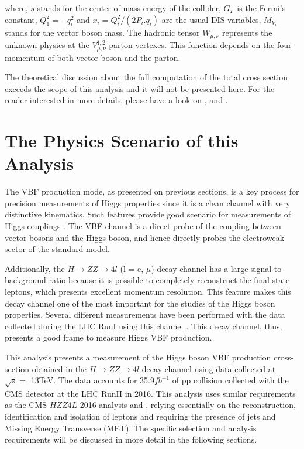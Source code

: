 where, $s$ stands for the center-of-mass energy of the collider, $G_{F}$ is the Fermi's constant, $Q_{1}^{2} = -q_{i}^{2}$ and $x_{i} = Q_{i}^{2}/(2P_{i}.q_{i})$ are the usual DIS variables, $M_{V_{i}}$ stands for the vector boson mass. The hadronic tensor $W_{\mu,\nu}$ represents the unknown physics at the $V_{\mu,\nu}^{1,2}$-parton vertexes. This function depends on the four-momentum of both vector boson and the parton. 

The theoretical discussion about the full computation of the total cross section exceeds the scope of this analysis and it will not be presented here. For the reader interested in more details, please have a look on \cite{bib:PhysRep457-1-2005}, \cite{bib:PhysRevLett69-3274-1992} and \cite{bib:PhysRevLett105-011801-2010}.


\section{The Physics Scenario of this Analysis}
The VBF production mode, as presented on previous sections, is a key process for precision measurements of Higgs properties since it is a clean channel with very distinctive kinematics. Such features provide good scenario for measurements of Higgs couplings \cite{bib:PhysRevD62_013009_2000}. The VBF channel is a direct probe of the coupling between vector bosons and the Higgs boson, and hence directly probes the electroweak sector of the standard model.

Additionally, the $H \rightarrow ZZ \rightarrow 4l$ (l = e, $\mu$) decay channel has a large signal-to-background ratio because it is possible to completely reconstruct the final state leptons, which presents excellent momentum resolution. This feature makes this decay channel one of the most important for the studies of the Higgs boson properties. Several different measurements have been performed with the data collected during the LHC RunI using this channel
\cite{bib:PhysRevLett110-081803-2013,bib:PhysRevD89-092007-2014,bib:PhysLettB-736-64-2014,bib:PhysRevD92-012004-2015,bib:PhysRevD92-072010-2015}. This decay channel, thus, presents a good frame to measure Higgs VBF production.

This analysis presents a measurement of the Higgs boson VBF production cross-section obtained in the $H \rightarrow ZZ \rightarrow 4l$ decay channel using data collected at $\sqrt{s}=$ 13TeV. The data accounts for 35.9$fb^{-1}$ of pp collision collected with the CMS detector at the LHC RunII in 2016. This analysis uses similar requirements as the CMS $HZZ4L$ 2016 analysis \cite{bib:CMS-AN-16-442} and \cite{bib:CMS-AN-16-328}, relying essentially on the reconstruction, identification and isolation of leptons and requiring the presence of jets and Missing Energy Transverse (MET). The specific selection and analysis requirements will be discussed in more detail in the following sections.

